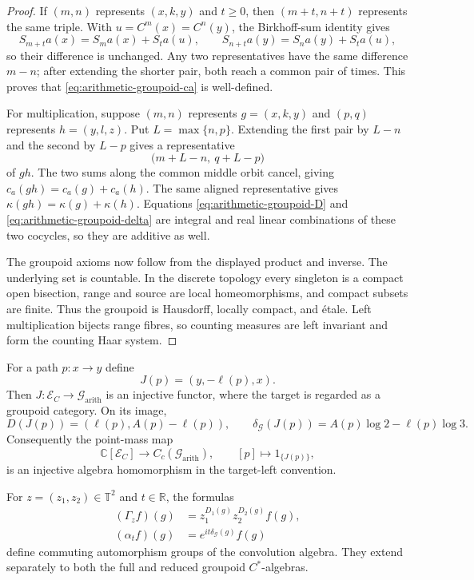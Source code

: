 \begin{proof}
If $(m,n)$ represents $(x,k,y)$ and $t\geq0$, then
$(m+t,n+t)$ represents the same triple.  With
$u=C^m(x)=C^n(y)$, the Birkhoff-sum identity gives
\[
 S_{m+t}a(x)=S_ma(x)+S_ta(u),\qquad
 S_{n+t}a(y)=S_na(y)+S_ta(u),
\]
so their difference is unchanged.  Any two representatives have the same
difference $m-n$; after extending the shorter pair, both reach a common pair
of times.  This proves that \eqref{eq:arithmetic-groupoid-ca} is
well-defined.

For multiplication, suppose $(m,n)$ represents $g=(x,k,y)$ and $(p,q)$
represents $h=(y,l,z)$.  Put $L=\max\{n,p\}$.  Extending the first pair by
$L-n$ and the second by $L-p$ gives a representative
\[
 \bigl(m+L-n,\ q+L-p\bigr)
\]
of $gh$.  The two sums along the common middle orbit cancel, giving
$c_a(gh)=c_a(g)+c_a(h)$.  The same aligned representative gives
$\kappa(gh)=\kappa(g)+\kappa(h)$.  Equations
\eqref{eq:arithmetic-groupoid-D} and
\eqref{eq:arithmetic-groupoid-delta} are integral and real linear
combinations of these two cocycles, so they are additive as well.

The groupoid axioms now follow from the displayed product and inverse.
The underlying set is countable.  In the discrete topology every singleton
is a compact open bisection, range and source are local homeomorphisms, and
compact subsets are finite.  Thus the groupoid is Hausdorff, locally compact,
and \'{e}tale.  Left multiplication bijects range fibres, so counting measures
are left invariant and form the counting Haar system.
\end{proof}

\begin{theorem}
\label{thm:path-to-arithmetic-groupoid}
For a path $p:x\to y$ define
\begin{equation}
\label{eq:path-groupoid-embedding}
 J(p)=(y,-\ell(p),x).
\end{equation}
Then $J\colon\mathcal E_C\to\mathcal G_{\mathrm{arith}}$ is an injective
functor, where the target is regarded as a groupoid category.  On its image,
\begin{equation}
\label{eq:path-groupoid-cocycle-recovery}
 D(J(p))=(\ell(p),A(p)-\ell(p)),
 \qquad
 \delta_{\mathcal G}(J(p))=A(p)\log2-\ell(p)\log3.
\end{equation}
Consequently the point-mass map
\[
 \mathbb C[\mathcal E_C]\longrightarrow C_c(\mathcal G_{\mathrm{arith}}),
 \qquad [p]\longmapsto 1_{\{J(p)\}},
\]
is an injective algebra homomorphism in the target-left convention.

For $z=(z_1,z_2)\in\mathbb T^2$ and $t\in\mathbb R$, the formulas
\begin{align}
 (\Gamma_zf)(g)&=z_1^{D_1(g)}z_2^{D_2(g)}f(g),
 \label{eq:arithmetic-groupoid-gauge}\\
 (\alpha_tf)(g)&=e^{it\delta_{\mathcal G}(g)}f(g)
 \label{eq:arithmetic-groupoid-time}
\end{align}
define commuting automorphism groups of the convolution algebra.  They
extend separately to both the full and reduced groupoid $C^*$-algebras.
\end{theorem}

